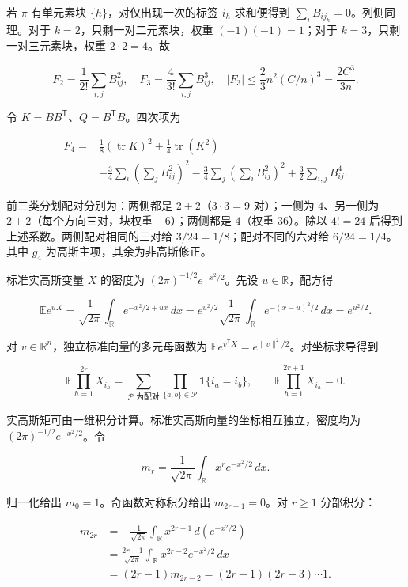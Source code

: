 \documentclass[11pt,a4paper]{article}
\begin{document}
若 \(\pi\) 有单元素块 \(\{h\}\)，对仅出现一次的标签 \(i_h\) 求和便得到 \(\sum_iB_{ij_h}=0\)。列侧同理。对于 \(k=2\)，只剩一对二元素块，权重 \((-1)(-1)=1\)；对于 \(k=3\)，只剩一对三元素块，权重 \(2\cdot2=4\)。故

\[
F_2=\frac1{2!}\sum_{i,j}B_{ij}^2,\quad
F_3=\frac4{3!}\sum_{i,j}B_{ij}^3,\quad
|F_3|\le\frac23n^2(C/n)^3=\frac{2C^3}{3n}.
\]

令 \(K=BB^{\mathsf T}\)、\(Q=B^{\mathsf T}B\)。四次项为

\[
\begin{aligned}
F_4={}&\frac18(\operatorname{tr}K)^2+\frac14\operatorname{tr}(K^2)\\
&-\frac34\sum_i\left(\sum_jB_{ij}^2\right)^2
-\frac34\sum_j\left(\sum_iB_{ij}^2\right)^2
+\frac32\sum_{i,j}B_{ij}^4.
\end{aligned}
\]

前三类分划配对分别为：两侧都是 \(2+2\)（\(3\cdot3=9\) 对）；一侧为 \(4\)、另一侧为 \(2+2\)（每个方向三对，块权重 \(-6\)）；两侧都是 \(4\)（权重 \(36\)）。除以 \(4!=24\) 后得到上述系数。两侧配对相同的三对给 \(3/24=1/8\)；配对不同的六对给 \(6/24=1/4\)。其中 \(g_4\) 为高斯主项，其余为非高斯修正。

标准实高斯变量 \(X\) 的密度为 \((2\pi)^{-1/2}e^{-x^2/2}\)。先设 \(u\in\mathbb R\)，配方得

\[
\mathbb Ee^{uX}=\frac1{\sqrt{2\pi}}\int_{\mathbb R}e^{-x^2/2+ux}\,dx
=e^{u^2/2}\frac1{\sqrt{2\pi}}\int_{\mathbb R}e^{-(x-u)^2/2}\,dx=e^{u^2/2}.
\]

对 \(v\in\mathbb R^n\)，独立标准向量的多元母函数为 \(\mathbb Ee^{v^{\mathsf T}X}=e^{\|v\|^2/2}\)。对坐标求导得到

\[
\mathbb E\prod_{h=1}^{2r}X_{i_h}
=\sum_{\mathcal P\text{ 为配对}}\prod_{\{a,b\}\in\mathcal P}\mathbf1\{i_a=i_b\},
\qquad \mathbb E\prod_{h=1}^{2r+1}X_{i_h}=0.
\]

实高斯矩可由一维积分计算。标准实高斯向量的坐标相互独立，密度均为 \((2\pi)^{-1/2}e^{-x^2/2}\)。令

\[
m_r=\frac1{\sqrt{2\pi}}\int_{\mathbb R}x^re^{-x^2/2}\,dx.
\]

归一化给出 \(m_0=1\)。奇函数对称积分给出 \(m_{2r+1}=0\)。对 \(r\ge1\) 分部积分：

\[
\begin{aligned}
m_{2r}
&=-\frac1{\sqrt{2\pi}}\int_{\mathbb R}x^{2r-1}\,d(e^{-x^2/2})\\
&=\frac{2r-1}{\sqrt{2\pi}}\int_{\mathbb R}x^{2r-2}e^{-x^2/2}\,dx\\
&=(2r-1)m_{2r-2}
=(2r-1)(2r-3)\cdots1.
\end{aligned}
\]
\end{document}
